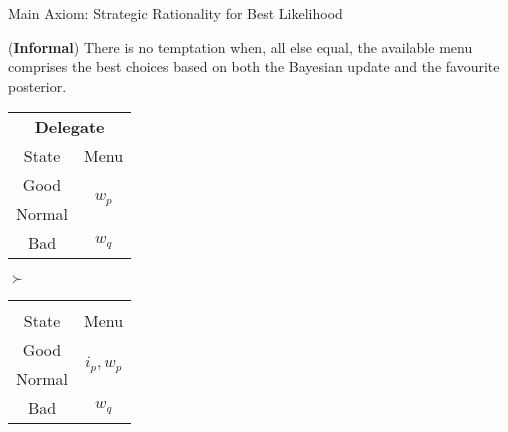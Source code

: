 \documentclass[usenames,dvipsnames,aspectratio=169,11pt, envcountsect, handout]{beamer}
\begin{document}
\begin{frame}[noframenumbering]{Main Axiom: Strategic Rationality for Best Likelihood}

	\begin{axiom}
		(\textbf{Informal}) There is no temptation when, all else equal, the available menu comprises the best choices based on both the Bayesian update and the favourite posterior. \: \: \hyperlink{srblapp}{}
	\end{axiom}

	\vfill

	\begin{table}[H]
		\centering
		\begin{minipage}{0.4\textwidth}
			\centering
			\begin{tabular}{c | c}
				\multicolumn{2}{c}{\textbf{Delegate}}                           \\
				State                & Menu                                     \\
				\hline
				{\color{blue}Good}   & \multirow{2}{*}{{\color{blue}\( w_p \)}} \\
				{\color{blue}Normal} &                                          \\
				Bad                  & \( w_q \)                                \\
			\end{tabular}
			\vspace{0.5cm} %
		\end{minipage}%
		\( \succ \)
		\begin{minipage}{0.4\textwidth}
			\centering
			\begin{tabular}{c | c}
				\multicolumn{2}{c}{}                                                \\
				State                & Menu                                         \\
				\hline
				{\color{blue}Good}   & \multirow{2}{*}{{\color{blue}\(i_p, w_p \)}} \\
				{\color{blue}Normal} &                                              \\
				Bad                  & \( w_q \)                                    \\
			\end{tabular}
			\vspace{0.5cm} %
		\end{minipage} %
	\end{table}

\end{frame}
\end{document}

